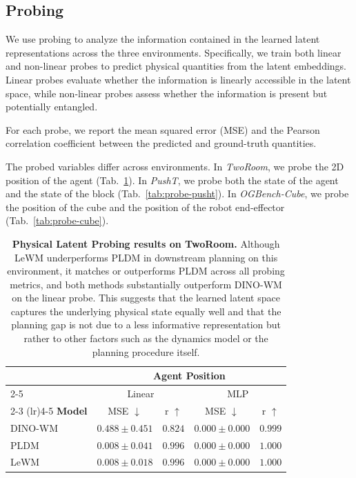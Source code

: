 \subsection{Probing} \label{appendix:probing}

We use probing to analyze the information contained in the learned latent representations across the three environments. Specifically, we train both linear and non-linear probes to predict physical quantities from the latent embeddings. Linear probes evaluate whether the information is linearly accessible in the latent space, while non-linear probes assess whether the information is present but potentially entangled.

For each probe, we report the mean squared error (MSE) and the Pearson correlation coefficient between the predicted and ground-truth quantities.

The probed variables differ across environments. In \textit{TwoRoom}, we probe the 2D position of the agent (Tab.~\ref{tab:probe-tworoom}). In \textit{PushT}, we probe both the state of the agent and the state of the block (Tab.~\ref{tab:probe-pusht}). In \textit{OGBench-Cube}, we probe the position of the cube and the position of the robot end-effector (Tab.~\ref{tab:probe-cube}).

\begin{table}[h]
\centering
\caption{\small \textbf{Physical Latent Probing results on TwoRoom.} Although LeWM underperforms PLDM in downstream planning on this environment, it matches or outperforms PLDM across all probing metrics, and both methods substantially outperform DINO-WM on the linear probe. This suggests that the learned latent space captures the underlying physical state equally well and that the planning gap is not due to a less informative representation but rather to other factors such as the dynamics model or the planning procedure itself.}
\begin{tabular}{l c c c c}
\toprule
& \multicolumn{4}{c}{\textbf{Agent Position}}\\
\cmidrule(lr){2-5}
& \multicolumn{2}{c}{Linear} & \multicolumn{2}{c}{MLP}\\
\cmidrule(lr){2-3} \cmidrule(lr){4-5}
\textbf{Model} & MSE $\downarrow$ & r $\uparrow$ & MSE $\downarrow$ & r $\uparrow$\\
\toprule
DINO-WM & $0.488 \pm 0.451$ & $0.824$ & $0.000 \pm 0.000$ & $0.999$\\
PLDM & $0.008 \pm 0.041$ & $0.996$ & $0.000 \pm 0.000$ & $1.000$\\
\midrule
LeWM & $0.008 \pm 0.018$ & $0.996$ & $0.000 \pm 0.000$ & $1.000$\\ 
\bottomrule
\end{tabular}
\vspace{2mm}
\label{tab:probe-tworoom}
\end{table}

